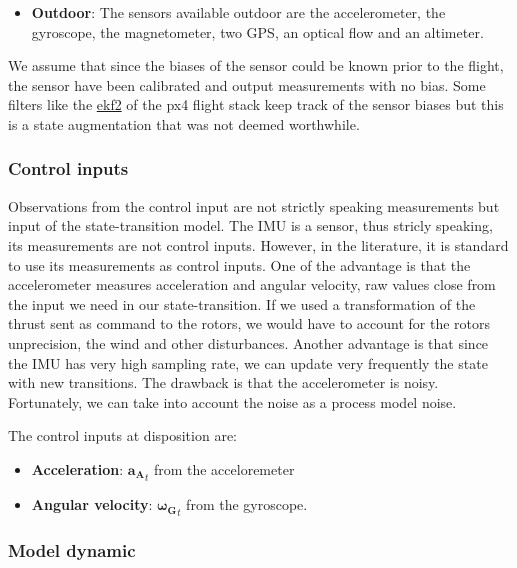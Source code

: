 \documentclass[12pt,]{article}
\providecommand{\tightlist}{%
  \setlength{\itemsep}{0pt}\setlength{\parskip}{0pt}}
\begin{document}
\begin{itemize}
\tightlist
\item
  \textbf{Outdoor}: The sensors available outdoor are the accelerometer,
  the gyroscope, the magnetometer, two GPS, an optical flow and an
  altimeter.
\end{itemize}

We assume that since the biases of the sensor could be known prior to
the flight, the sensor have been calibrated and output measurements with
no bias. Some filters like the
\href{https://dev.px4.io/en/tutorials/tuning_the_ecl_ekf.html}{ekf2} of
the px4 flight stack keep track of the sensor biases but this is a state
augmentation that was not deemed worthwhile.

\subsubsection{Control inputs}\label{control-inputs}

Observations from the control input are not strictly speaking
measurements but input of the state-transition model. The IMU is a
sensor, thus stricly speaking, its measurements are not control inputs.
However, in the literature, it is standard to use its measurements as
control inputs. One of the advantage is that the accelerometer measures
acceleration and angular velocity, raw values close from the input we
need in our state-transition. If we used a transformation of the thrust
sent as command to the rotors, we would have to account for the rotors
unprecision, the wind and other disturbances. Another advantage is that
since the IMU has very high sampling rate, we can update very frequently
the state with new transitions. The drawback is that the accelerometer
is noisy. Fortunately, we can take into account the noise as a process
model noise.

The control inputs at disposition are:

\begin{itemize}
\tightlist
\item
  \textbf{Acceleration}: \(\mathbf{a_A}_t\) from the acceloremeter
\item
  \textbf{Angular velocity}: \(\mathbf{\boldsymbol{\omega}_G}_t\) from
  the gyroscope.
\end{itemize}

\hypertarget{model-dynamic}{\subsubsection{Model
dynamic}\label{model-dynamic}}
\end{document}
